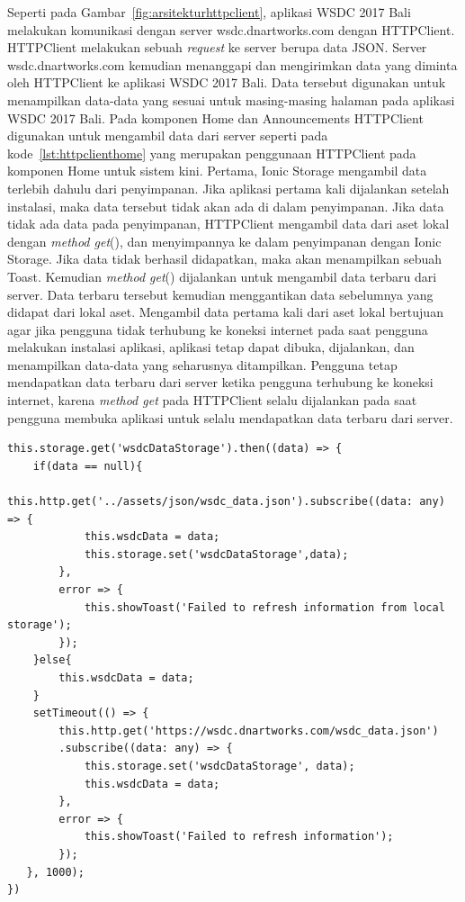 Seperti pada Gambar~\ref{fig:arsitekturhttpclient}, aplikasi WSDC 2017 Bali melakukan komunikasi dengan server wsdc.dnartworks.com dengan HTTPClient. HTTPClient melakukan sebuah \textit{request} ke server berupa data JSON. Server wsdc.dnartworks.com kemudian menanggapi dan mengirimkan data yang diminta oleh HTTPClient ke aplikasi WSDC 2017 Bali. Data tersebut digunakan untuk menampilkan data-data yang sesuai untuk masing-masing halaman pada aplikasi WSDC 2017 Bali. 
\newpage
Pada komponen Home dan Announcements HTTPClient digunakan untuk mengambil data dari server seperti pada kode~\ref{lst:httpclienthome} yang merupakan penggunaan HTTPClient pada komponen Home untuk sistem kini. Pertama, Ionic Storage mengambil data terlebih dahulu dari penyimpanan. Jika aplikasi pertama kali dijalankan setelah instalasi, maka data tersebut tidak akan ada di dalam penyimpanan. Jika data tidak ada data pada penyimpanan, HTTPClient mengambil data dari aset lokal dengan \textit{method get}(), dan menyimpannya ke dalam penyimpanan dengan Ionic Storage. Jika data tidak berhasil didapatkan, maka akan menampilkan sebuah Toast. Kemudian \textit{method get}() dijalankan untuk mengambil data terbaru dari server. Data terbaru tersebut kemudian menggantikan data sebelumnya yang didapat dari lokal aset. Mengambil data pertama kali dari aset lokal bertujuan agar jika pengguna tidak terhubung ke koneksi internet pada saat pengguna melakukan instalasi aplikasi, aplikasi tetap dapat dibuka, dijalankan, dan menampilkan data-data yang seharusnya ditampilkan. Pengguna tetap mendapatkan data terbaru dari server ketika pengguna terhubung ke koneksi internet, karena \textit{method get} pada HTTPClient selalu dijalankan pada saat pengguna membuka aplikasi untuk selalu mendapatkan data terbaru dari server.
\begin{lstlisting}[label={lst:httpclienthome}, caption=HTTPClient pada Komponen Home]
this.storage.get('wsdcDataStorage').then((data) => {
	if(data == null){
		this.http.get('../assets/json/wsdc_data.json').subscribe((data: any) => {
    		this.wsdcData = data;
        	this.storage.set('wsdcDataStorage',data);       
        },
        error => {
         	this.showToast('Failed to refresh information from local storage');
        });
	}else{    
		this.wsdcData = data;
    }
    setTimeout(() => {
        this.http.get('https://wsdc.dnartworks.com/wsdc_data.json')
        .subscribe((data: any) => {
        	this.storage.set('wsdcDataStorage', data);
          	this.wsdcData = data;
        },
        error => {
          	this.showToast('Failed to refresh information');
        });
   }, 1000);
})
\end{lstlisting} 

